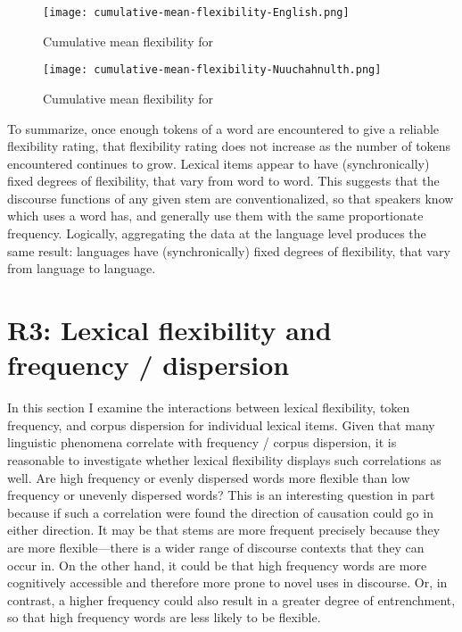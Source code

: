 \begin{figure}[h!]
  \centering
  \caption{Cumulative mean flexibility for }
  \label{fig:cumulative-mean-flexibility-English}
  \texttt{[image: cumulative-mean-flexibility-English.png]}
\end{figure}

\begin{figure}[h!]
  \centering
  \caption{Cumulative mean flexibility for }
  \label{fig:cumulative-mean-flexibility-Nuuchahnulth}
  \texttt{[image: cumulative-mean-flexibility-Nuuchahnulth.png]}
\end{figure}

To summarize, once enough tokens of a word are encountered to give a reliable flexibility rating, that flexibility rating does not increase as the number of tokens encountered continues to grow. Lexical items appear to have (synchronically) fixed degrees of flexibility, that vary from word to word. This suggests that the discourse functions of any given stem are conventionalized, so that speakers know which uses a word has, and generally use them with the same proportionate frequency. Logically, aggregating the data at the language level produces the same result: languages have (synchronically) fixed degrees of flexibility, that vary from language to language.

\section{R3: Lexical flexibility and frequency / dispersion}
\label{sec:4.5}

In this section I examine the interactions between lexical flexibility, token frequency, and corpus dispersion for individual lexical items. Given that many linguistic phenomena correlate with frequency / corpus dispersion, it is reasonable to investigate whether lexical flexibility displays such correlations as well. Are high frequency or evenly dispersed words more flexible than low frequency or unevenly dispersed words? This is an interesting question in part because if such a correlation were found the direction of causation could go in either direction. It may be that stems are more frequent precisely because they are more flexible—there is a wider range of discourse contexts that they can occur in. On the other hand, it could be that high frequency words are more cognitively accessible and therefore more prone to novel uses in discourse. Or, in contrast, a higher frequency could also result in a greater degree of entrenchment, so that high frequency words are less likely to be flexible.

